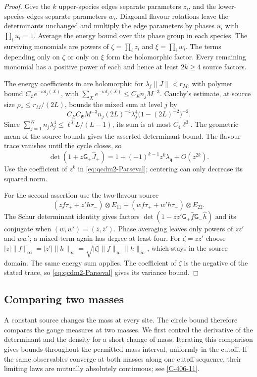 \documentclass[11pt,letterpaper,reqno]{amsart}
\theoremstyle{definition}
\theoremstyle{remark}
\begin{document}
\begin{proof}
Give the $k$ upper-species edges separate parameters $z_i$, and
the lower-species edges separate parameters $w_i$.  Diagonal
flavour rotations leave the determinants unchanged and multiply
the edge parameters by phases $u_i$ with $\prod_i u_i=1$.
Average the energy bound over this phase group in each species.
The surviving monomials are powers of
$\zeta=\prod_i z_i$ and $\xi=\prod_i w_i$.
The terms depending only on $\zeta$ or only on $\xi$ form the
holomorphic factor.  Every remaining monomial has a positive
power of each and hence at least $2k\ge4$ source factors.

The energy coefficients in \cite[Prop. 10.6]{QCDM1} are
holomorphic for $\lambda_j\|J\|<r_M$, with polymer bound
$C_{\mathfrak E}e^{-\kappa d_j(X)}$, with
$\sum_Xe^{-\kappa d_j(X)}\le C_En_jM^{-3}$.
Cauchy's estimate, at source size
$\rho_*\le r_M/(2L)$, bounds the mixed sum at level $j$ by
\[
 C_EC_{\mathfrak E}M^{-3}n_j
       (2L)^{-4}\lambda_j^4
       \bigl(1-(2L)^{-2}\bigr)^{-2}.
\]
Since $\sum_{j=1}^Kn_j\lambda_j^4
\le\ell^3L/(L-1)$, its sum is at most $C_4\ell^3$.
The geometric mean of the source bounds gives the asserted
determinant bound.  The flavour trace vanishes until the cycle
closes, so
\[
 \det(1+z\mathsf G_+\hat J_+)
       =1+(-1)^{k-1}z^k\lambda_{\mathsf q}+O(z^{2k}).
\]
Use the coefficient of $z^k$ in \eqref{eq:qcdm2-Parseval};
centering can only decrease its squared norm.

For the second assertion use the two-flavour source
\[
 (zf\tau_++z'h\tau_-)\otimes E_{11}
 +(wf\tau_++w'h\tau_-)\otimes E_{22}.
\]
The Schur determinant identity gives factors
$\det(1-zz'\mathsf G_+\hat f\mathsf G_-\hat h)$ and its
conjugate when $(w,w')=(\bar z,\bar z')$.  Phase averaging leaves
only powers of $zz'$ and $ww'$; a mixed term again has degree at
least four.  For $\zeta=zz'$ choose
$|z|\|f\|_\infty=|z'|\|h\|_\infty
=\sqrt{|\zeta|\|f\|_\infty\|h\|_\infty}$, which stays in the
source domain.  The same energy sum applies.  The coefficient of
$\zeta$ is the negative of the stated trace, so
\eqref{eq:qcdm2-Parseval} gives its variance bound.
\end{proof}

\subsection{Comparing two masses}\label{sec:qcdm2-mass-comparison}

A constant source changes the mass at every site. The circle
bound therefore compares the gauge measures at two masses.
We first control the derivative of the determinant and the
density for a short change of mass. Iterating this comparison
gives bounds throughout the permitted mass interval, uniformly
in the cutoff. If the same observables converge at both masses
along one cutoff sequence, their limiting laws are mutually
absolutely continuous; see \cref{C-406-11}.
\end{document}
